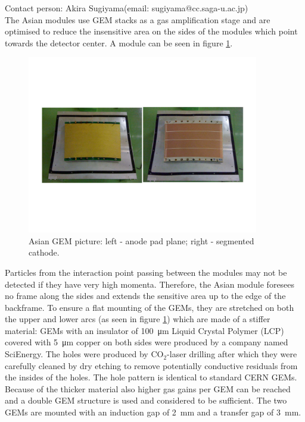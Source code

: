 \label{chap:TPC_sec:asian_gems}
Contact person: Akira Sugiyama(email: sugiyama@cc.saga-u.ac.jp)\\


The Asian modules use GEM stacks as a gas amplification stage and are optimised to reduce the insensitive area
on the sides of the modules which point towards the detector center.
A module can be seen in figure \ref{fig_Fig1asiangempicture}.

\begin{figure}[!htb]
  \centering
  \includegraphics[width=0.9\textwidth]{plots/TPC-AG_Fig1asaingempicture.pdf}
  \caption{Asian GEM picture: left - anode pad plane; right - segmented cathode.}
  \label{fig_Fig1asiangempicture}
\end{figure}

Particles from the interaction point passing
between the modules may not be detected if they have very high momenta. Therefore, the Asian module foresees no frame along
the sides and extends the sensitive
area up to the edge of the backframe. To ensure a flat mounting of the GEMs, they are stretched on both the upper
and lower arcs (as seen in figure \ref{fig_Fig1asiangempicture}) which are made of a stiffer material:
GEMs with an insulator of \SI{100}{\micro\meter} Liquid Crystal Polymer (LCP)
covered with \SI{5}{\micro\meter} copper on both sides were produced by a company named SciEnergy.
The holes were
produced by CO$_2$-laser drilling after which they were carefully cleaned by dry etching to remove potentially
conductive residuals from the insides of the holes. The
hole pattern is identical to standard CERN GEMs. Because of the thicker material also higher gas gains per GEM
can be reached and a double GEM
structure is used and considered to be sufficient.
The two GEMs are mounted with an induction gap of \SI{2}{\milli\meter} and a transfer gap of \SI{3}{\milli\meter}.

